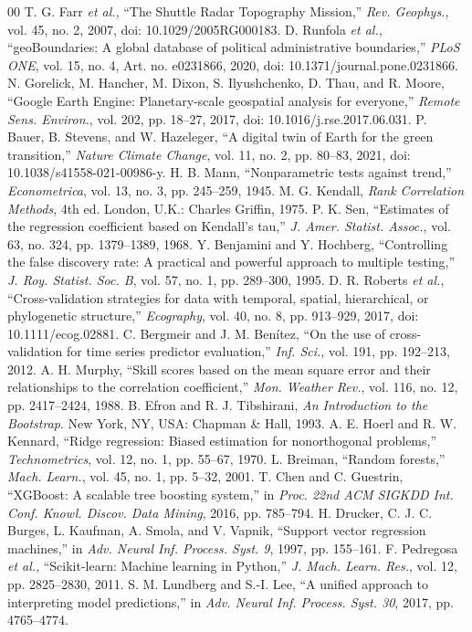 \documentclass[conference]{IEEEtran}
\begin{document}
\begin{thebibliography}{00}
 T. G. Farr \textit{et al.}, ``The Shuttle Radar Topography Mission,'' \textit{Rev. Geophys.}, vol. 45, no. 2, 2007, doi: 10.1029/2005RG000183.
 D. Runfola \textit{et al.}, ``geoBoundaries: A global database of political administrative boundaries,'' \textit{PLoS ONE}, vol. 15, no. 4, Art. no. e0231866, 2020, doi: 10.1371/journal.pone.0231866.
 N. Gorelick, M. Hancher, M. Dixon, S. Ilyushchenko, D. Thau, and R. Moore, ``Google Earth Engine: Planetary-scale geospatial analysis for everyone,'' \textit{Remote Sens. Environ.}, vol. 202, pp. 18--27, 2017, doi: 10.1016/j.rse.2017.06.031.
 P. Bauer, B. Stevens, and W. Hazeleger, ``A digital twin of Earth for the green transition,'' \textit{Nature Climate Change}, vol. 11, no. 2, pp. 80--83, 2021, doi: 10.1038/s41558-021-00986-y.
 H. B. Mann, ``Nonparametric tests against trend,'' \textit{Econometrica}, vol. 13, no. 3, pp. 245--259, 1945.
 M. G. Kendall, \textit{Rank Correlation Methods}, 4th ed. London, U.K.: Charles Griffin, 1975.
 P. K. Sen, ``Estimates of the regression coefficient based on Kendall's tau,'' \textit{J. Amer. Statist. Assoc.}, vol. 63, no. 324, pp. 1379--1389, 1968.
 Y. Benjamini and Y. Hochberg, ``Controlling the false discovery rate: A practical and powerful approach to multiple testing,'' \textit{J. Roy. Statist. Soc. B}, vol. 57, no. 1, pp. 289--300, 1995.
 D. R. Roberts \textit{et al.}, ``Cross-validation strategies for data with temporal, spatial, hierarchical, or phylogenetic structure,'' \textit{Ecography}, vol. 40, no. 8, pp. 913--929, 2017, doi: 10.1111/ecog.02881.
 C. Bergmeir and J. M. Ben\'{i}tez, ``On the use of cross-validation for time series predictor evaluation,'' \textit{Inf. Sci.}, vol. 191, pp. 192--213, 2012.
 A. H. Murphy, ``Skill scores based on the mean square error and their relationships to the correlation coefficient,'' \textit{Mon. Weather Rev.}, vol. 116, no. 12, pp. 2417--2424, 1988.
 B. Efron and R. J. Tibshirani, \textit{An Introduction to the Bootstrap}. New York, NY, USA: Chapman \& Hall, 1993.
 A. E. Hoerl and R. W. Kennard, ``Ridge regression: Biased estimation for nonorthogonal problems,'' \textit{Technometrics}, vol. 12, no. 1, pp. 55--67, 1970.
 L. Breiman, ``Random forests,'' \textit{Mach. Learn.}, vol. 45, no. 1, pp. 5--32, 2001.
 T. Chen and C. Guestrin, ``XGBoost: A scalable tree boosting system,'' in \textit{Proc. 22nd ACM SIGKDD Int. Conf. Knowl. Discov. Data Mining}, 2016, pp. 785--794.
 H. Drucker, C. J. C. Burges, L. Kaufman, A. Smola, and V. Vapnik, ``Support vector regression machines,'' in \textit{Adv. Neural Inf. Process. Syst. 9}, 1997, pp. 155--161.
 F. Pedregosa \textit{et al.}, ``Scikit-learn: Machine learning in Python,'' \textit{J. Mach. Learn. Res.}, vol. 12, pp. 2825--2830, 2011.
 S. M. Lundberg and S.-I. Lee, ``A unified approach to interpreting model predictions,'' in \textit{Adv. Neural Inf. Process. Syst. 30}, 2017, pp. 4765--4774.
\end{thebibliography}
\end{document}
